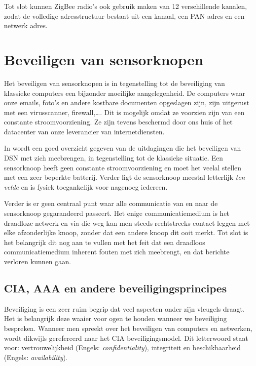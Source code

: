 Tot slot kunnen ZigBee radio's ook gebruik maken van 12 verschillende kanalen,
zodat de volledige adresstructuur bestaat uit een kanaal, een PAN adres en een
netwerk adres.

\section{Beveiligen van sensorknopen}
\label{section:beveiligen}

Het beveiligen van sensorknopen is in tegenstelling tot de beveiliging van
klassieke computers een bijzonder moeilijke aangelegenheid. De computers waar
onze emails, foto's en andere kostbare documenten opgeslagen zijn, zijn
uitgerust met een virusscanner, firewall,\dots. Dit is mogelijk omdat ze
voorzien zijn van een constante stroomvoorziening. Ze zijn tevens beschermd
door ons huis of het datacenter van onze leverancier van internetdiensten.

In \cite{dargie2010fundamentals} wordt een goed overzicht gegeven van de
uitdagingen die het beveiligen van DSN met zich meebrengen, in tegenstelling
tot de klassieke situatie. Een sensorknoop heeft geen constante
stroomvoorziening en moet het veelal stellen met een zeer beperkte batterij.
Verder ligt de sensorknoop meestal letterlijk \emph{ten velde} en is fysiek
toegankelijk voor nagenoeg iedereen.

Verder is er geen centraal punt waar alle communicatie van en naar de
sensorknoop gegarandeerd passeert. Het enige communicatiemedium is het
draadloze netwerk en via die weg kan men steeds rechtstreeks contact leggen met
elke afzonderlijke knoop, zonder dat een andere knoop dit ooit merkt. Tot slot
is het belangrijk dit nog aan te vullen met het feit dat een draadloos
communicatiemedium inherent fouten met zich meebrengt, en dat berichte verloren
kunnen gaan.

\subsection{CIA, AAA en andere beveiligingsprincipes}
\label{subsection:cia}

Beveiliging is een zeer ruim begrip dat veel aspecten onder zijn vleugels
draagt. Het is belangrijk deze waaier voor ogen te houden wanneer we
beveiliging bespreken. Wanneer men spreekt over het beveiligen van computers en
netwerken, wordt dikwijls gerefereerd naar het CIA beveiligingsmodel. Dit
letterwoord staat voor: vertrouwelijkheid (Engels: \emph{confidentiality}),
integriteit en beschikbaarheid (Engels: \emph{availability}).

